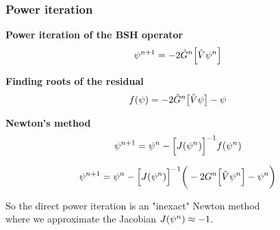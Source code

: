 
\begin{frame}
  \frametitle{Power iteration}
  \centering
  \textbf{Power iteration of the BSH operator}
  \begin{equation}
    \nonumber
    \psi^{n+1} = -2\hat{G}^n\Big[\hat{V} \psi^n\Big]
  \end{equation}

  \vspace{3mm}

  \textbf{Finding roots of the residual}
  \begin{equation}
    \nonumber
    f(\psi) = -2\hat{G}^n\big[\hat{V} \psi\big] - \psi
  \end{equation}

  \vspace{3mm}

  \textbf{Newton's method}
  \begin{equation}
    \nonumber
    \psi^{n+1} = \psi^n - \Big[J(\psi^n)\Big]^{-1} f(\psi^n)
  \end{equation}

  \begin{equation}
  \nonumber
    \psi^{n+1} = \psi^n - \Big[J(\psi^n)\Big]^{-1}
    \bigg(-2G^n\Big[\hat{V} \psi^n\Big] - \psi^n\bigg)
  \end{equation}

  \vspace{3mm}

  So the direct power iteration is an "inexact" Newton method\\
  where we approximate the Jacobian $J(\psi^n) \approx -1$.
\end{frame}


